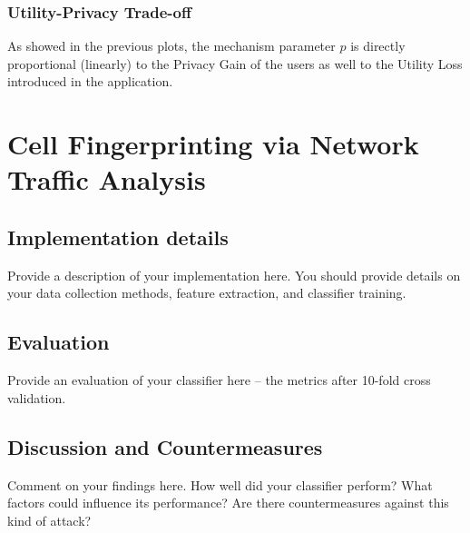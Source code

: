 \documentclass[10pt,conference,compsocconf]{IEEEtran}
\begin{document}
\subsubsection{Utility-Privacy Trade-off}
As showed in the previous plots, the mechanism parameter $p$ is directly proportional (linearly) to the Privacy Gain of the users as well to the Utility Loss introduced in the application.
\section{Cell Fingerprinting via Network Traffic Analysis}

\subsection{Implementation details}
Provide a description of your implementation here. You should provide details on your data collection methods, feature extraction, and classifier training.

\subsection{Evaluation}
Provide an evaluation of your classifier here -- the metrics after 10-fold cross validation.

\subsection{Discussion and Countermeasures}
Comment on your findings here. How well did your classifier perform? What factors could influence its performance? Are there countermeasures against this kind of attack?



\end{document}
